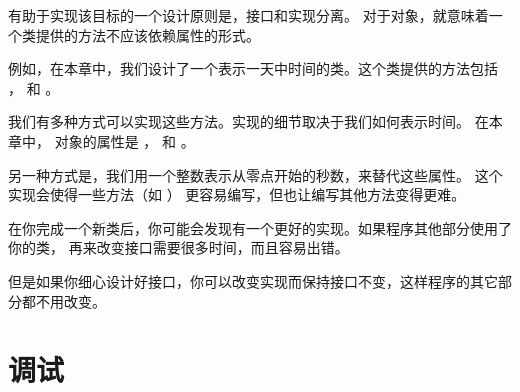 有助于实现该目标的一个设计原则是，接口和实现分离。
对于对象，就意味着一个类提供的方法不应该依赖属性的形式。


例如，在本章中，我们设计了一个表示一天中时间的类。这个类提供的方法包括
 ， 和  。


我们有多种方式可以实现这些方法。实现的细节取决于我们如何表示时间。
在本章中， 对象的属性是  ， 和  。


另一种方式是，我们用一个整数表示从零点开始的秒数，来替代这些属性。
这个实现会使得一些方法（如  ） 更容易编写，但也让编写其他方法变得更难。


在你完成一个新类后，你可能会发现有一个更好的实现。如果程序其他部分使用了你的类，
再来改变接口需要很多时间，而且容易出错。


但是如果你细心设计好接口，你可以改变实现而保持接口不变，这样程序的其它部分都不用改变。


\section{调试}

